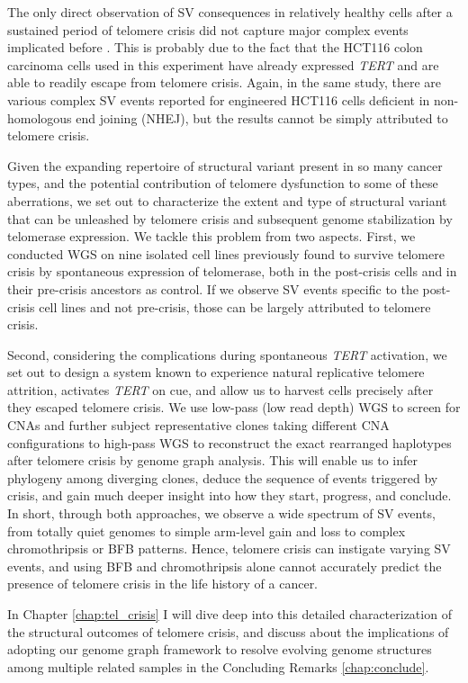 \documentclass[phd,tocprelim]{cornell}
\begin{document}
The only direct observation of SV consequences in relatively healthy cells after a sustained period of telomere crisis did not capture major complex events implicated before \cite{Cleal2019-dk}. This is probably due to the fact that the HCT116 colon carcinoma cells used in this experiment have already expressed \textit{TERT} and are able to readily escape from telomere crisis. Again, in the same study, there are various complex SV events reported for engineered HCT116 cells deficient in non-homologous end joining (NHEJ), but the results cannot be simply attributed to telomere crisis.

Given the expanding repertoire of structural variant present in so many cancer types, and the potential contribution of telomere dysfunction to some of these aberrations, we set out to characterize the extent and type of structural variant that can be unleashed by telomere crisis and subsequent genome stabilization by telomerase expression. We tackle this problem from two aspects. First, we conducted WGS on nine isolated cell lines previously found to survive telomere crisis by spontaneous expression of telomerase, both in the post-crisis cells and in their pre-crisis ancestors as control. If we observe SV events specific to the post-crisis cell lines and not pre-crisis, those can be largely attributed to telomere crisis.

Second, considering the complications during spontaneous \textit{TERT} activation, we set out to design a system known to experience natural replicative telomere attrition, activates \textit{TERT} on cue, and allow us to harvest cells precisely after they escaped telomere crisis. We use low-pass (low read depth) WGS to screen for CNAs and further subject representative clones taking different CNA configurations to high-pass WGS to reconstruct the exact rearranged haplotypes after telomere crisis by genome graph analysis. This will enable us to infer phylogeny among diverging clones, deduce the sequence of events triggered by crisis, and gain much deeper insight into how they start, progress, and conclude. In short, through both approaches, we observe a wide spectrum of SV events, from totally quiet genomes to simple arm-level gain and loss to complex chromothripsis or BFB patterns. Hence, telomere crisis can instigate varying SV events, and using BFB and chromothripsis alone cannot accurately predict the presence of telomere crisis in the life history of a cancer.

In Chapter \ref{chap:tel_crisis} I will dive deep into this detailed characterization of the structural outcomes of telomere crisis, and discuss about the implications of adopting our genome graph framework to resolve evolving genome structures among multiple related samples in the Concluding Remarks \ref{chap:conclude}.
\end{document}
